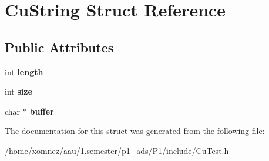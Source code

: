 \hypertarget{structCuString}{}\section{Cu\+String Struct Reference}
\label{structCuString}
\subsection*{Public Attributes}
\begin{DoxyCompactItemize}
\item 
\mbox{\label{structCuString_a5e715d2b207fe60a0433e8bf0ed0e470}} 
int {\bfseries length}
\item 
\mbox{\label{structCuString_abddb898dd12ac916879510d4c4c97f05}} 
int {\bfseries size}
\item 
\mbox{\label{structCuString_ab202a8630764f5864030f8a8a4ae6911}} 
char $\ast$ {\bfseries buffer}
\end{DoxyCompactItemize}


The documentation for this struct was generated from the following file\+:\begin{DoxyCompactItemize}
\item 
/home/xomnez/aau/1.\+semester/p1\+\_\+ads/\+P1/include/Cu\+Test.\+h\end{DoxyCompactItemize}
